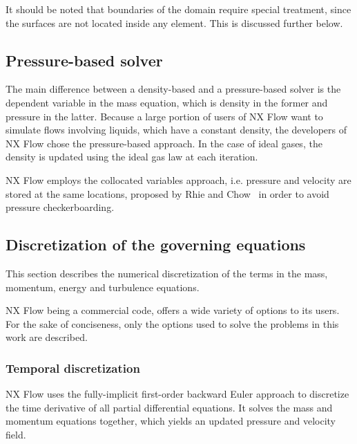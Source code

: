 It should be noted that boundaries of the domain require special treatment, since the surfaces are not located inside any element. This is discussed further below.

\subsection{Pressure-based solver}
\label{sec:pbased}
The main difference between a density-based and a pressure-based solver is the dependent variable in the mass equation, which is density in the former and pressure in the latter. Because a large portion of users of NX Flow want to simulate flows involving liquids, which have a constant density, the developers of NX Flow chose the pressure-based approach. In the case of ideal gases, the density is updated using the ideal gas law at each iteration.

NX Flow employs the collocated variables approach, i.e. pressure and velocity are stored at the same locations, proposed by Rhie and Chow~\cite{rhie1983numerical} in order to avoid pressure checkerboarding.

\subsection{Discretization of the governing equations}
\label{sec:nxnum}
This section describes the numerical discretization of the terms in the mass, momentum, energy and turbulence equations. 

NX Flow being a commercial code, offers a wide variety of options to its users. For the sake of conciseness, only the options used to solve the problems in this work are described. 

\subsubsection{Temporal discretization}
NX Flow uses the fully-implicit first-order backward Euler approach to discretize the time derivative of all partial differential equations. It solves the mass and momentum equations together, which yields an updated pressure and velocity field. 


